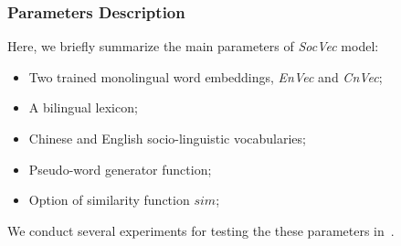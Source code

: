 \subsubsection{Parameters Description}
\label{sec:pd}
Here, we briefly summarize the main parameters of \textit{SocVec} model:
\begin{itemize}
\item Two trained monolingual word embeddings, \textit{EnVec} and \textit{CnVec};  
\item A bilingual lexicon;
\item Chinese and English socio-linguistic vocabularies; 
\item Pseudo-word generator function; 
\item Option of similarity function $sim$; 
\end{itemize} 
We conduct several experiments for testing the these parameters in~.
